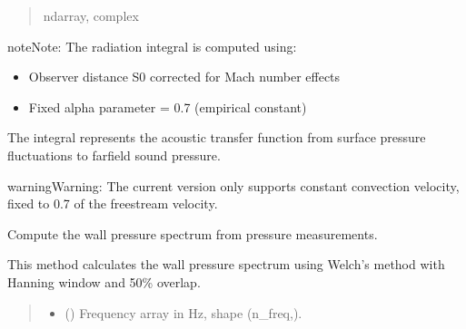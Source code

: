 \documentclass[letterpaper,10pt,english]{sphinxmanual}
\begin{document}
\begin{fulllineitems}
\begin{fulllineitems}
\begin{quote}
\begin{description}
\sphinxAtStartPar
ndarray, complex

\end{description}\end{quote}

\begin{sphinxadmonition}{note}{Note:}
\sphinxAtStartPar
The radiation integral is computed using:
\begin{itemize}
\item {} 
\sphinxAtStartPar
Observer distance S0 corrected for Mach number effects

\item {} 
\sphinxAtStartPar
Fixed alpha parameter = 0.7 (empirical constant)

\end{itemize}
\end{sphinxadmonition}

\sphinxAtStartPar
The integral represents the acoustic transfer function from
surface pressure fluctuations to far\sphinxhyphen{}field sound pressure.

\begin{sphinxadmonition}{warning}{Warning:}
\sphinxAtStartPar
The current version only supports constant convection velocity, fixed to
0.7 of the freestream velocity.
\end{sphinxadmonition}

\end{fulllineitems}


\begin{fulllineitems}
\label{\detokenize{amiet_model:amiet_self_noise.amiet_model.AmietModel.compute_wps}}
\pysigstartsignatures
\pysiglinewithargsret
{}
{}
{}
\pysigstopsignatures
\sphinxAtStartPar
Compute the wall pressure spectrum from pressure measurements.

\sphinxAtStartPar
This method calculates the wall pressure spectrum using Welch’s
method with Hanning window and 50\% overlap.
\begin{quote}\begin{description}
\sphinxAtStartPar
\begin{itemize}
\item {} 
\sphinxAtStartPar
{} () \textendash{} Frequency array in Hz, shape (n\_freq,).


\end{itemize}
\end{description}
\end{quote}
\end{fulllineitems}
\end{fulllineitems}
\end{document}
